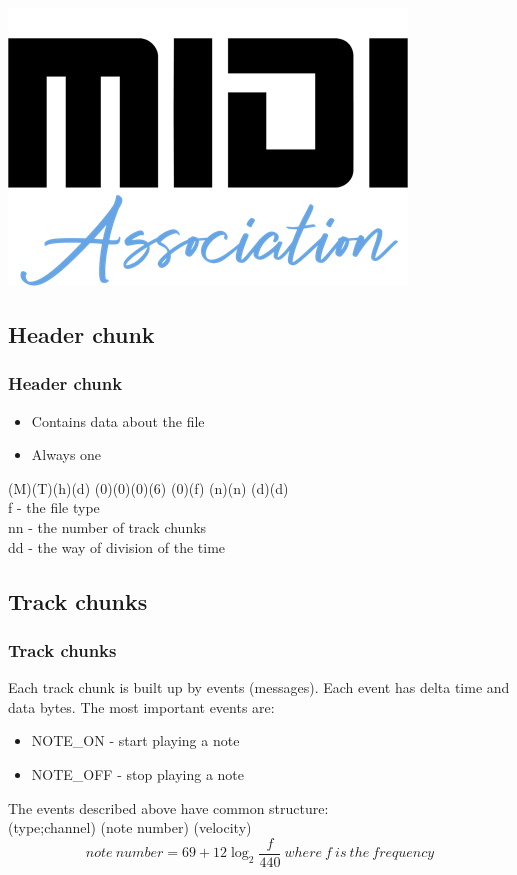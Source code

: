 \documentclass[12pt]{beamer}
\begin{document}
\begin{frame}
\begin{center}
                \includegraphics[scale=0.3]{midiasoc}
            \end{center}
            
        \end{frame}
        \subsection{Header chunk}
        \begin{frame}
            \frametitle{Header chunk}
            \begin{itemize}
                \item Contains data about the file
                \item Always one
            \end{itemize}
            \begin{center}
                {\large (M)(T)(h)(d) (0)(0)(0)(6) (0)(f) (n)(n) (d)(d)} \\ \vspace{0.5cm}
                f - the file type\\
                nn - the number of track chunks\\
                dd - the way of division of the time\\
            \end{center}
        \end{frame}
        \subsection{Track chunks}
        \begin{frame}
            \frametitle{Track chunks}
            Each track chunk is built up by events (messages). Each event has delta time and data bytes.
            The most important events are:
            \begin{itemize}
                \item NOTE\_ON - start playing a note
                \item NOTE\_OFF - stop playing a note
            \end{itemize}
            The events described above have common structure:\\
            (type;channel) (note number) (velocity)
            $$note\ number = 69 + 12\log_2 \frac{f}{440}\ where\ f\ is\ the\ frequency$$
        \end{frame}
\end{document}
